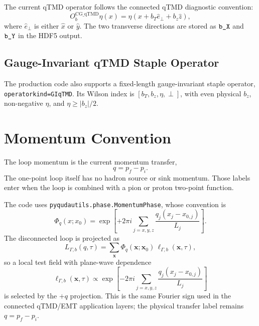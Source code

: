 \documentclass[11pt,a4paper]{article}
\newcommand{\code}[1]{\texttt{\begingroup\def\_{\textunderscore\allowbreak}#1\endgroup}}
\begin{document}
The current qTMD operator follows the connected qTMD diagnostic convention:
\begin{equation}
  O_b^{\mathrm{CG\_qTMD}}\eta(x)
  =
  \eta(x + b_T \hat{e}_{\perp} + b_z\hat{z}),
\end{equation}
where \(\hat{e}_{\perp}\) is either \(\hat{x}\) or \(\hat{y}\).  The two
transverse directions are stored as \(\code{b\_X}\) and \(\code{b\_Y}\) in the
HDF5 output.

\subsection{Gauge-Invariant qTMD Staple Operator}

The production code also supports a fixed-length gauge-invariant staple
operator, \code{operator\_kind=GI\_qTMD}. Its Wilson index is
\([b_T,b_z,\eta,\perp]\), with even physical \(b_z\), non-negative \(\eta\),
and \(\eta\ge |b_z|/2\).

\section{Momentum Convention}

The loop momentum is the current momentum transfer,
\begin{equation}
  q = p_f - p_i.
\end{equation}
The one-point loop itself has no hadron source or sink momentum.  Those labels
enter when the loop is combined with a pion or proton two-point function.

The code uses \code{pyquda\_utils.phase.MomentumPhase}, whose convention is
\begin{equation}
  \Phi_q(x;x_0)
  =
  \exp\left[
    +2\pi i
    \sum_{j=x,y,z}
    \frac{q_j(x_j-x_{0,j})}{L_j}
  \right].
\end{equation}
The disconnected loop is projected as
\begin{equation}
  L_{\Gamma,b}(q,\tau)
  =
  \sum_{\mathbf{x}}
  \Phi_q(\mathbf{x};\mathbf{x}_0)\,
  \ell_{\Gamma,b}(\mathbf{x},\tau),
\end{equation}
so a local test field with plane-wave dependence
\begin{equation}
  \ell_{\Gamma,b}(\mathbf{x},\tau)
  \propto
  \exp\left[
    -2\pi i
    \sum_{j=x,y,z}
    \frac{q_j(x_j-x_{0,j})}{L_j}
  \right]
\end{equation}
is selected by the \(+q\) projection.  This is the same Fourier sign used in
the connected qTMD/EMT application layers; the physical transfer label remains
\(q=p_f-p_i\).
\end{document}
